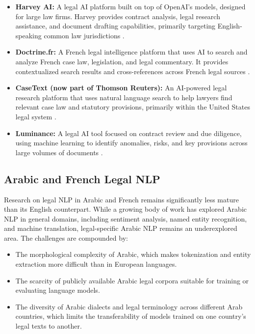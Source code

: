 \begin{itemize}
    \item \textbf{Harvey AI:} A legal \ac{AI} platform built on top of
    OpenAI's models, designed for large law firms. Harvey provides
    contract analysis, legal research assistance, and document drafting
    capabilities, primarily targeting English-speaking common law
    jurisdictions \cite{harvey2024website}.

    \item \textbf{Doctrine.fr:} A French legal intelligence platform that
    uses \ac{AI} to search and analyze French case law, legislation, and
    legal commentary. It provides contextualized search results and
    cross-references across French legal sources \cite{doctrine2024website}.

    \item \textbf{CaseText (now part of Thomson Reuters):} An \ac{AI}-powered
    legal research platform that uses natural language search to help
    lawyers find relevant case law and statutory provisions, primarily
    within the United States legal system \cite{casetext2024website}.

    \item \textbf{Luminance:} A legal \ac{AI} tool focused on contract
    review and due diligence, using machine learning to identify anomalies,
    risks, and key provisions across large volumes of documents \cite{luminance2024website}.
\end{itemize}

\subsection{Arabic and French Legal NLP}

Research on legal \ac{NLP} in Arabic and French remains significantly less
mature than its English counterpart. While a growing body of work has
explored Arabic \ac{NLP} in general domains, including sentiment analysis,
named entity recognition, and machine translation, legal-specific Arabic
\ac{NLP} remains an underexplored area. The challenges are compounded by:

\begin{itemize}
    \item The morphological complexity of Arabic, which makes tokenization
    and entity extraction more difficult than in European languages.

    \item The scarcity of publicly available Arabic legal corpora suitable
    for training or evaluating language models.

    \item The diversity of Arabic dialects and legal terminology across
    different Arab countries, which limits the transferability of models
    trained on one country's legal texts to another.
\end{itemize}

